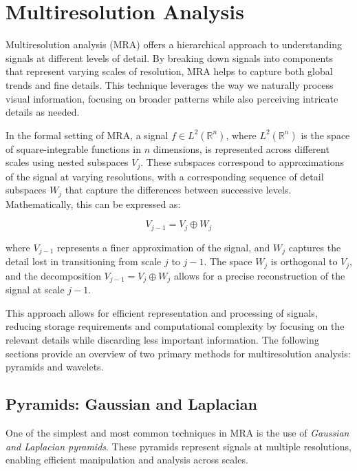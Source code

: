\section{Multiresolution Analysis}

Multiresolution analysis (MRA) offers a hierarchical approach to understanding signals at different levels of detail. By breaking down signals into components that represent varying scales of resolution, MRA helps to capture both global trends and fine details. This technique leverages the way we naturally process visual information, focusing on broader patterns while also perceiving intricate details as needed.


In the formal setting of MRA, a signal \( f \in L^2(\mathbb{R}^n) \), where \( L^2(\mathbb{R}^n) \) is the space of square-integrable functions in \( n \) dimensions, is represented across different scales using nested subspaces \( V_j \). These subspaces correspond to approximations of the signal at varying resolutions, with a corresponding sequence of detail subspaces \( W_j \) that capture the differences between successive levels. Mathematically, this can be expressed as:

\[
V_{j-1} = V_j \oplus W_j
\]

where \( V_{j-1} \) represents a finer approximation of the signal, and \( W_j \) captures the detail lost in transitioning from scale \( j \) to \( j-1 \). The space \( W_j \) is orthogonal to \( V_j \), and the decomposition \( V_{j-1} = V_j \oplus W_j \) allows for a precise reconstruction of the signal at scale \( j-1 \).

This approach allows for efficient representation and processing of signals, reducing storage requirements and computational complexity by focusing on the relevant details while discarding less important information. The following sections provide an overview of two primary methods for multiresolution analysis: pyramids and wavelets.

\subsection{Pyramids: Gaussian and Laplacian}

One of the simplest and most common techniques in MRA is the use of \textit{Gaussian and Laplacian pyramids}. These pyramids represent signals at multiple resolutions, enabling efficient manipulation and analysis across scales.

